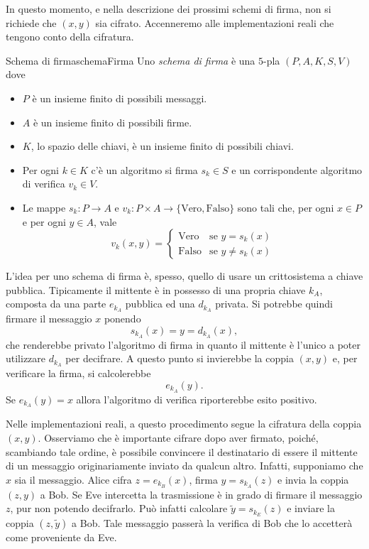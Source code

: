	\begin{oss}
	In questo momento, e nella descrizione dei prossimi schemi di firma, non si richiede che \((x,y)\) sia cifrato. Accenneremo alle implementazioni reali che tengono conto della cifratura.
	\end{oss}

	\begin{defn}{Schema di firma}{schemaFirma}
	Uno \emph{schema di firma} è una \(5\)-pla \((P,A,K,S,V)\) dove
	\begin{itemize}
		\item \(P\) è un insieme finito di possibili messaggi.
		\item \(A\) è un insieme finito di possibili firme.
		\item \(K\), lo spazio delle chiavi, è un insieme finito di possibili chiavi.
		\item Per ogni \(k\in K\) c'è un algoritmo si firma \(s_k\in S\) e un corrispondente algoritmo di verifica \(v_k\in V\).
		\item Le mappe \(s_k \colon P \to A\) e \(v_k\colon P \times A \to \{\text{Vero},\text{Falso}\}\) sono tali che, per ogni \(x\in P\) e per ogni \(y\in A\), vale
			\[
			v_k(x,y) = 	\begin{cases}
						\text{Vero} & \text{se }y=s_k(x)\\
						\text{Falso} & \text{se }y\neq s_k(x)
						\end{cases}
			\]
	\end{itemize}
	\end{defn}
	\noindent
	L'idea per uno schema di firma è, spesso, quello di usare un crittosistema a chiave pubblica. Tipicamente il mittente è in possesso di una propria chiave \(k_A\), composta da una parte \(e_{k_A}\) pubblica ed una \(d_{k_A}\) privata. Si potrebbe quindi firmare il messaggio \(x\) ponendo
		\[
		s_{k_A}(x) = y = d_{k_A}(x),
		\]
	che renderebbe privato l'algoritmo di firma in quanto il mittente è l'unico a poter utilizzare \(d_{k_A}\) per decifrare.
	A questo punto si invierebbe la coppia \((x,y)\) e, per verificare la firma, si calcolerebbe
		\[
		e_{k_A}(y).
		\]
	Se \(e_{k_A}(y)=x\) allora l'algoritmo di verifica riporterebbe esito positivo.

	\begin{oss}
	Nelle implementazioni reali, a questo procedimento segue la cifratura della coppia \((x,y)\).
	Osserviamo che è importante cifrare dopo aver firmato, poiché, scambiando tale ordine, è possibile convincere il destinatario di essere il mittente di un messaggio originariamente inviato da qualcun altro.
	Infatti, supponiamo che \(x\) sia il messaggio. Alice cifra \(z=e_{k_B}(x)\), firma \(y=s_{k_A}(z)\) e invia la coppia \((z,y)\) a Bob. Se Eve intercetta la trasmissione è in grado di firmare il messaggio \(z\), pur non potendo decifrarlo.
	Può infatti calcolare \(\tilde{y}=s_{k_E}(z)\) e inviare la coppia \((z,\tilde{y})\) a Bob. Tale messaggio passerà la verifica di Bob che lo accetterà come proveniente da Eve.
	\end{oss}

